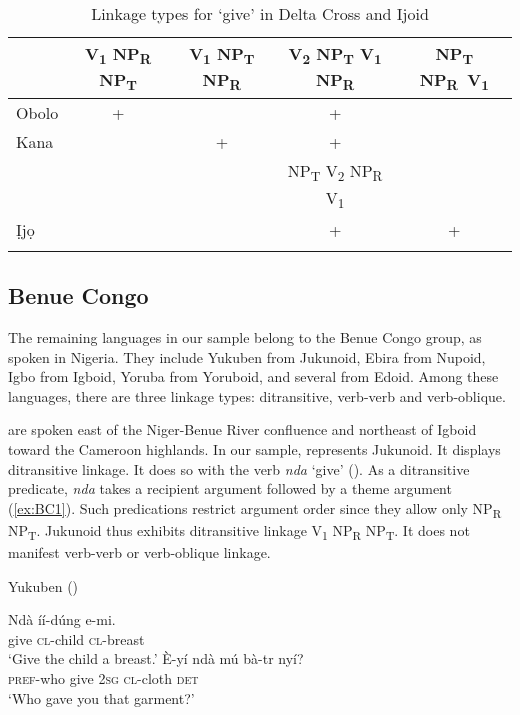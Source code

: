 \documentclass[output=paper,colorlinks,citecolor=brown]{langscibook}
\begin{document}
\begin{table}
\caption{Linkage types for ‘give’ in Delta Cross and Ijoid}
\label{tab:LinkageDelta}
 \begin{tabular}{lcccc}
  \lsptoprule
 &  V\textsubscript{1} NP\textsubscript{R} NP\textsubscript{T}	&V\textsubscript{1} NP\textsubscript{T} NP\textsubscript{R} &	V\textsubscript{2} NP\textsubscript{T} V\textsubscript{1} NP\textsubscript{R}  &
NP\textsubscript{T} NP\textsubscript{R}\
V\textsubscript{1} \\
\midrule
Obolo & + & & +&\\
Kana & & + & +  &\\
&&&NP\textsubscript{T} V\textsubscript{2} NP\textsubscript{R} V\textsubscript{1}& \\
Ịjọ &&  & + & + \\
  \lspbottomrule
 \end{tabular}
\end{table}

\subsection{Benue Congo}

The remaining languages in our sample belong to the Benue Congo group, as spoken in Nigeria. They include Yukuben from Jukunoid, Ebira from Nupoid, Igbo from Igboid, Yoruba from Yoruboid, and several from Edoid. Among these languages, there are three linkage types: ditransitive, verb-verb and verb-oblique.

 are spoken east of the Niger-Benue River confluence and northeast of Igboid toward the Cameroon highlands. In our sample,  represents Jukunoid. It displays ditransitive linkage. It does so with the verb \textit{nda} ‘give’ (\cite{Anyanwu2013}). As a ditransitive predicate, \textit{nda} takes a recipient argument followed by a theme argument (\ref{ex:BC1}). Such predications restrict argument order since they allow only NP\textsubscript{R} NP\textsubscript{T}. Jukunoid thus exhibits ditransitive linkage V\textsubscript{1} NP\textsubscript{R} NP\textsubscript{T}. It does not manifest verb-verb or verb-oblique linkage.

\ea \label{ex:BC1} Yukuben (\cite[204, 270]{Anyanwu2013})
\begin{xlist}
\ex
\gll Ndà		íí-dúng			e-mi.\\
						give		\textsc{cl}-child		\textsc{cl}-breast\\
\glt						‘Give the child a breast.’
\ex
\gll 	È-yí						ndà		mú		bà-tr			nyí?\\
						\textsc{pref}-who		give		2\textsc{sg}		\textsc{cl}-cloth	\textsc{det}\\
\glt						‘Who gave you that garment?’
\end{xlist}
\z
\end{document}
